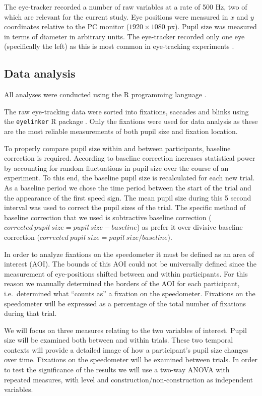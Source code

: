 The eye-tracker recorded a number of raw variables at a rate of 500 Hz, two of which are relevant for the current study.
Eye positions were measured in \(x\) and \(y\) coordinates relative to the PC monitor (\(1920 \times 1080\) px).
Pupil size was measured in terms of diameter in arbitrary units.
The eye-tracker recorded only one eye (specifically the left) as this is most common in eye-tracking experiments \citep{Hutton2019}.

\subsection{Data analysis}
All analyses were conducted using the R programming language \citep{R}.

The raw eye-tracking data were sorted into fixations, saccades and blinks using the \texttt{eyelinker} R package \citep{eyelinker}.
Only the fixations were used for data analysis as these are the most reliable measurements of both pupil size and fixation location.

To properly compare pupil size within and between participants, baseline correction is required. 
According to \citet{Mathot2018} baseline correction increases statistical power by accounting for random fluctuations in pupil size over the course of an experiment.
To this end, the baseline pupil size is recalculated for each new trial.
As a baseline period we chose the time period between the start of the trial and the appearance of the first speed sign.
The mean pupil size during this 5 second interval was used to correct the pupil sizes of the trial.
The specific method of baseline correction that we used is subtractive baseline correction (\(corrected\ pupil\ size = pupil\ size - baseline\)) 
as \citet{Mathot2018} prefer it over divisive baseline correction (\(corrected\ pupil\ size = pupil\ size / baseline\)).

In order to analyze fixations on the speedometer it must be defined as an area of interest (AOI).
The bounds of this AOI could not be universally defined since the measurement of eye-positions shifted between and within participants.
For this reason we manually determined the borders of the AOI for each participant, i.e.\ determined what ``counts as'' a fixation on the speedometer.
Fixations on the speedometer will be expressed as a percentage of the total number of fixations during that trial.

We will focus on three measures relating to the two variables of interest. 
Pupil size will be examined both between and within trials.
These two temporal contexts will provide a detailed image of how a participant's pupil size changes over time.
Fixations on the speedometer will be examined between trials. 
In order to test the significance of the results we will use a two-way ANOVA with repeated measures, with \nback level and construction/non-construction as independent variables.